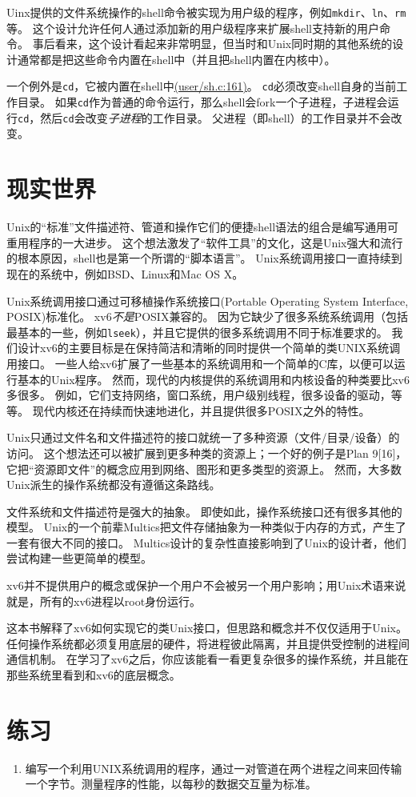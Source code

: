 Uinx提供的文件系统操作的shell命令被实现为用户级的程序，例如\texttt{mkdir}、\texttt{ln}、\texttt{rm}等。
这个设计允许任何人通过添加新的用户级程序来扩展shell支持新的用户命令。
事后看来，这个设计看起来非常明显，但当时和Unix同时期的其他系统的设计通常都是把这些命令内置在shell中（并且把shell内置在内核中）。

一个例外是\texttt{cd}，它被内置在shell中\href{https://github.com/mit-pdos/xv6-riscv/blob/riscv//user/sh.c#L161}{(user/sh.c:161)}。
\texttt{cd}必须改变shell自身的当前工作目录。
如果\texttt{cd}作为普通的命令运行，那么shell会fork一个子进程，子进程会运行\texttt{cd}，然后\texttt{cd}会改变\emph{子进程}的工作目录。
父进程（即shell）的工作目录并不会改变。

\section{现实世界}
Unix的“标准”文件描述符、管道和操作它们的便捷shell语法的组合是编写通用可重用程序的一大进步。
这个想法激发了“软件工具”的文化，这是Unix强大和流行的根本原因，shell也是第一个所谓的“脚本语言”。
Unix系统调用接口一直持续到现在的系统中，例如BSD、Linux和Mac OS X。

Unix系统调用接口通过可移植操作系统接口(Portable Operating System Interface, POSIX)标准化。
xv6\emph{不是}POSIX兼容的。
因为它缺少了很多系统系统调用（包括最基本的一些，例如\texttt{lseek}），并且它提供的很多系统调用不同于标准要求的。
我们设计xv6的主要目标是在保持简洁和清晰的同时提供一个简单的类UNIX系统调用接口。
一些人给xv6扩展了一些基本的系统调用和一个简单的C库，以便可以运行基本的Unix程序。
然而，现代的内核提供的系统调用和内核设备的种类要比xv6多很多。
例如，它们支持网络，窗口系统，用户级别线程，很多设备的驱动，等等。
现代内核还在持续而快速地进化，并且提供很多POSIX之外的特性。

Unix只通过文件名和文件描述符的接口就统一了多种资源（文件/目录/设备）的访问。
这个想法还可以被扩展到更多种类的资源上；一个好的例子是Plan 9[16]，它把“资源即文件”的概念应用到网络、图形和更多类型的资源上。
然而，大多数Unix派生的操作系统都没有遵循这条路线。

文件系统和文件描述符是强大的抽象。
即使如此，操作系统接口还有很多其他的模型。
Unix的一个前辈Multics把文件存储抽象为一种类似于内存的方式，产生了一套有很大不同的接口。
Multics设计的复杂性直接影响到了Unix的设计者，他们尝试构建一些更简单的模型。

xv6并不提供用户的概念或保护一个用户不会被另一个用户影响；用Unix术语来说就是，所有的xv6进程以root身份运行。

这本书解释了xv6如何实现它的类Unix接口，但思路和概念并不仅仅适用于Unix。
任何操作系统都必须复用底层的硬件，将进程彼此隔离，并且提供受控制的进程间通信机制。
在学习了xv6之后，你应该能看一看更复杂很多的操作系统，并且能在那些系统里看到和xv6的底层概念。

\section{练习}

\begin{enumerate}
    \item 编写一个利用UNIX系统调用的程序，通过一对管道在两个进程之间来回传输一个字节。测量程序的性能，以每秒的数据交互量为标准。
\end{enumerate}
